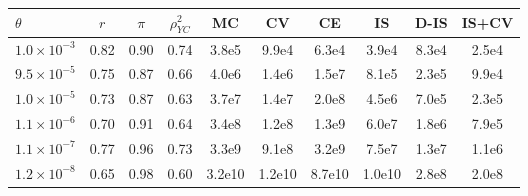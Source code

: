 \footnotesize\setlength{\tabcolsep}{2.2pt}
\begin{tabular}{@{}lccccccccc@{}}
\toprule
$\theta$ & $r$ & $\pi$ & $\rho^2_{YC}$ & MC & CV & CE & IS & D-IS & IS+CV\\
\midrule
$1.0\times10^{-3}$ & 0.82 & 0.90 & 0.74 & 3.8e5 & 9.9e4 & 6.3e4 & 3.9e4 & 8.3e4 & 2.5e4\\
$9.5\times10^{-5}$ & 0.75 & 0.87 & 0.66 & 4.0e6 & 1.4e6 & 1.5e7 & 8.1e5 & 2.3e5 & 9.9e4\\
$1.0\times10^{-5}$ & 0.73 & 0.87 & 0.63 & 3.7e7 & 1.4e7 & 2.0e8 & 4.5e6 & 7.0e5 & 2.3e5\\
$1.1\times10^{-6}$ & 0.70 & 0.91 & 0.64 & 3.4e8 & 1.2e8 & 1.3e9 & 6.0e7 & 1.8e6 & 7.9e5\\
$1.1\times10^{-7}$ & 0.77 & 0.96 & 0.73 & 3.3e9 & 9.1e8 & 3.2e9 & 7.5e7 & 1.3e7 & 1.1e6\\
$1.2\times10^{-8}$ & 0.65 & 0.98 & 0.60 & 3.2e10 & 1.2e10 & 8.7e10 & 1.0e10 & 2.8e8 & 2.0e8\\
\bottomrule
\end{tabular}
